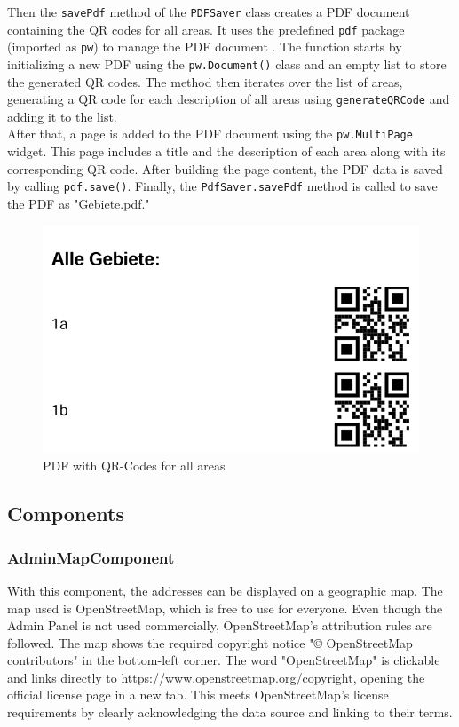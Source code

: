 Then the \texttt{savePdf} method of the \texttt{PDFSaver} class creates a PDF document containing the QR codes for all areas. It uses the predefined \texttt{pdf} package (imported as \texttt{pw}) to manage the PDF document \autocite{pub.dev/pdf}. The function starts by initializing a new PDF using the \texttt{pw.Document()} class and an empty list to store the generated QR codes. The method then iterates over the list of areas, generating a QR code for each description of all areas using \texttt{generateQRCode} and adding it to the list.\\

After that, a page is added to the PDF document using the \texttt{pw.MultiPage} widget. This page includes a title and the description of each area along with its corresponding QR code. After building the page content, the PDF data is saved by calling \texttt{pdf.save()}. Finally, the \texttt{PdfSaver.savePdf} method is called to save the PDF as "Gebiete.pdf."

\begin{figure}[H]
    \centering
    \includegraphics[width=0.4\linewidth]{images/AdminPanel/GebietePDF.png}
    \caption{PDF with QR-Codes for all areas}
\end{figure}




\subsection{Components}

\subsubsection{AdminMapComponent}
\label{fig:AdminMapComponent}
With this component, the addresses can be displayed on a geographic map. The map used is OpenStreetMap, which is free to use for everyone. Even though the Admin Panel is not used commercially, OpenStreetMap's attribution rules are followed. The map shows the required copyright notice "© OpenStreetMap contributors" in the bottom-left corner. The word "OpenStreetMap" is clickable and links directly to \url{https://www.openstreetmap.org/copyright}, opening the official license page in a new tab. This meets OpenStreetMap's license requirements by clearly acknowledging the data source and linking to their terms. \autocite{OpenStreetMap}

